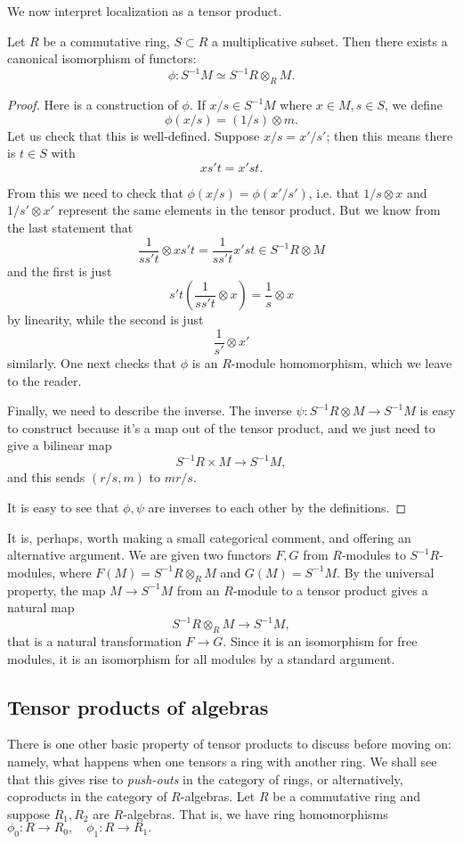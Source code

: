 We now interpret localization as a tensor product.
\begin{proposition} \label{locisbasechange}
Let $R$ be a commutative ring, $S \subset R$ a multiplicative subset. Then
there
exists a canonical isomorphism of functors:
\[ \phi:  S^{-1}M \simeq S^{-1 }R \otimes_R M . \]
\end{proposition}
\begin{proof}
Here is a construction of $\phi$. If $x/s \in S^{-1}M$ where $x \in M, s \in
S$, we define
\[ \phi(x/s) = (1/s) \otimes m.  \]
Let us check that this is well-defined. Suppose $x/s = x'/s'$; then this means
there is $t \in S$ with
\[ xs't = x'st . \]

From this we need to check that $\phi(x/s) = \phi(x'/s')$, i.e. that $1/s
\otimes x$ and $1/s' \otimes x'$ represent the same elements in the tensor
product. But we know from the last statement that
\[ \frac{1}{ss't} \otimes xs't = \frac{1}{ss't} x'st \in S^{-1}R \otimes M \]
and the first is just
\[ s't( \frac{1}{ss't} \otimes x) = \frac{1}{s} \otimes x  \]
by linearity, while the second is just
\[ \frac{1}{s'} \otimes x'  \]
similarly. One next checks that $\phi$ is an $R$-module homomorphism, which we
leave to the reader.

Finally, we need to describe the inverse. The inverse $\psi: S^{-1}R \otimes M
\to S^{-1}M$ is easy to construct because it's a map out of the tensor product,
and we just need to give a bilinear map
\[ S^{-1} R \times M \to S^{-1}M , \]
and this sends $(r/s, m)$ to $mr/s$.

It is easy to see that $\phi, \psi$ are inverses to each other by the
definitions.
\end{proof}

It is, perhaps, worth making a small categorical comment, and offering an
alternative argument.
We are given two functors $F,G$ from $R$-modules to $S^{-1}R$-modules, where
$F(M) = S^{-1}R \otimes_R M$ and $G(M) = S^{-1}M$.
By the universal property, the map $M \to S^{-1}M$ from an $R$-module to a
tensor product gives  a natural map
\[ S^{-1}R \otimes_R M \to S^{-1}M,  \]
that is a natural transformation $F \to G$.
Since it is an isomorphism for free modules, it is an isomorphism for all
modules by a standard argument.


\subsection{Tensor products of algebras}
\label{tensprodalg}
There is one other basic property of tensor products to discuss before moving
on: namely, what happens when one tensors a ring with another ring. We shall
see that this gives rise to  \emph{push-outs} in the category of rings, or
alternatively, coproducts in the category of $R$-algebras.
Let $R$ be a commutative ring and suppose $R_1, R_2$ are $R$-algebras. That is,  we have ring homomorphisms
\( \phi_0: R \to R_0, \quad \phi_1: R \to R_1.	\)

